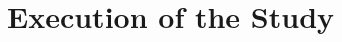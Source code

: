 \documentclass[../UsabilityReport.tex]{subfiles}
\begin{document}
\chapter{Execution of the Study}
\thispagestyle{fancy}
	
	
	
	
\end{document}
